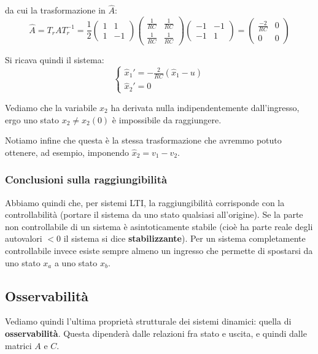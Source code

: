 \documentclass[a4paper,11pt]{article}
\begin{document}
da cui la trasformazione in $\hat{A}$:
$$
\hat{A} = T_r A T_r^{-1} = \frac{1}{2} \begin{pmatrix}
	1 & 1 \\
	1 & -1
\end{pmatrix} \begin{pmatrix}
	\frac{1}{RC} & \frac{1}{RC} \\ 
	\frac{1}{RC} & \frac{1}{RC} 
\end{pmatrix}
\begin{pmatrix}
	-1 & -1 \\
	-1 & 1
\end{pmatrix} = \begin{pmatrix}
	\frac{-2}{RC} & 0 \\
	0 & 0
\end{pmatrix}
$$

Si ricava quindi il sistema:
\[
	\begin{cases}
		\hat{x}_1' = -\frac{2}{RC} (\hat{x}_1 - u) \\
		\hat{x}_2' = 0
	\end{cases}
\]

Vediamo che la variabile $x_2$ ha derivata nulla indipendentemente dall'ingresso, ergo uno stato $x_2 \neq x_2(0)$ è impossibile da raggiungere.

Notiamo infine che questa è la stessa trasformazione che avremmo potuto ottenere, ad esempio, imponendo $\hat{x}_2 = v_1 - v_2$.

\subsubsection{Conclusioni sulla raggiungibilità}
Abbiamo quindi che, per sistemi LTI, la raggiungibilità corrisponde con la controllabilità (portare il sistema da uno stato qualsiasi all'origine).
Se la parte non controllabile di un sistema è asintoticamente stabile (cioè ha parte reale degli autovalori $< 0$ il sistema si dice \textbf{stabilizzante}).
Per un sistema completamente controllabile invece esiste sempre almeno un ingresso che permette di spostarsi da uno stato $x_a$ a uno stato $x_b$.

\subsection{Osservabilità}
Vediamo quindi l'ultima proprietà strutturale dei sistemi dinamici: quella di \textbf{osservabilità}.
Questa dipenderà dalle relazioni fra stato e uscita, e quindi dalle matrici $A$ e $C$.
\end{document}
